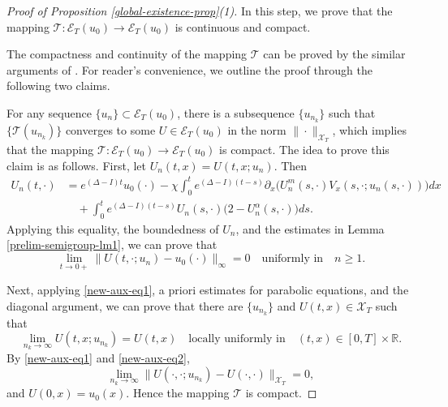 \documentclass[11pt]{article} %
\theoremstyle{remark}
\theoremstyle{remark}
\numberwithin{equation}{section}
\numberwithin{figure}{section}
\numberwithin{table}{section}
\begin{document}
\begin{proof} [Proof of Proposition \ref{global-existence-prop}(1)]
\smallskip

 In this step, we prove that the mapping $\mathcal{T} :\mathcal{E}_T(u_0)\to  \mathcal{E}_T(u_0)$ is  continuous and compact. 

\smallskip

The compactness and continuity of the mapping $\mathcal{T}$ can be proved by  the similar arguments  of \cite[Lemma 4.3]{SaSh2017-1}.
For reader's convenience, we outline the proof through  the following two claims.

\smallskip

 For any sequence $\{u_n\}\subset \mathcal{E}_T(u_0)$, there is a subsequence $\{u_{n_k}\}$ such that $\{\mathcal{T}(u_{n_k})\}$ converges  to some $U\in\mathcal{E}_T(u_0)$ in the norm $\|\cdot\|_{\mathcal{X}_T}$, which implies  that the  mapping $\mathcal{T} :\mathcal{E}_T(u_0)\to  \mathcal{E}_T(u_0)$ is compact.  The idea to prove this claim is as follows.  First,  let
$U_n(t,x)=U(t,x;u_n)$. Then
\begin{align*}
U_n(t,\cdot)&=e^{(\Delta -I)t}u_0(\cdot)-\chi \int_0^t e^{(\Delta-I)(t-s)}\partial_x \big(U_{n}^m(s,\cdot)V_x(s,\cdot;u_{n}(s,\cdot))\big)dx\\
&\quad +\int_0^t e^{(\Delta-I)(t-s)}U_{n}(s,\cdot) 
\big(2-U^\alpha_{n}(s,\cdot)\big)ds.
\end{align*}
Applying this equality, the boundedness of $U_n$,  and the estimates in Lemma \ref{prelim-semigroup-lm1}, we can prove
that
\begin{equation}
\label{new-aux-eq1}
\lim_{t\to 0+} \|U(t,\cdot;u_{n})-u_0(\cdot)\|_\infty=0\quad \text{
uniformly in}\quad n\ge 1.
\end{equation} 

Next,  applying \eqref{new-aux-eq1}, a priori estimates for
parabolic equations,  and the diagonal argument, we can prove that there are $\{u_{n_k}\}$ and  $U(t,x)\in\mathcal{X}_T$ such that
\begin{equation}
\label{new-aux-eq2}
\lim_{n_k\to\infty} U(t,x;u_{n_k})=U(t,x)\quad \text{locally uniformly in}\quad (t,x)\in [0,T]\times\mathbb{R}.
\end{equation}
By \eqref{new-aux-eq1} and \eqref{new-aux-eq2},
$$
\lim_{n_k\to\infty}\|U(\cdot,\cdot;u_{n_k})-U(\cdot,\cdot)\|_{\mathcal{X}_T}=0,
$$
and $U(0,x)=u_0(x)$. Hence the mapping $\mathcal{T}$ is compact.


\smallskip


\end{proof}
\end{document}
